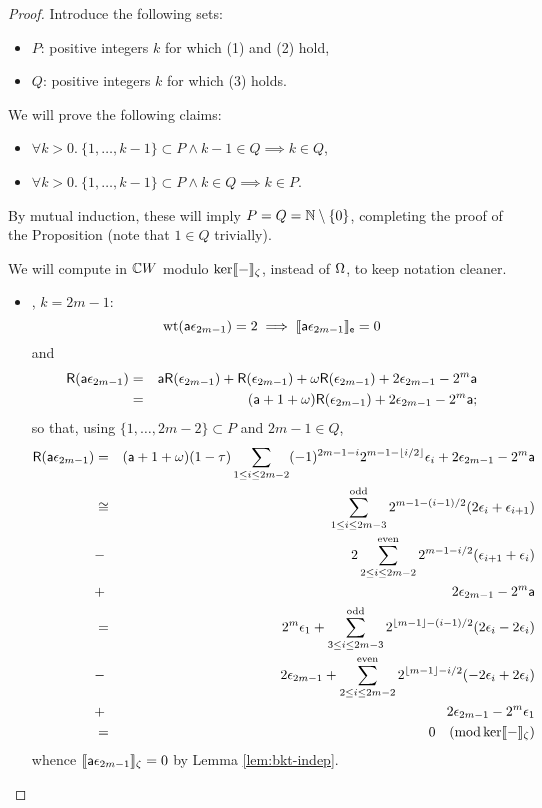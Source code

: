 \begin{proof}
Introduce the following sets: 
\begin{itemize}
        \item $P$: positive integers $k$ for which (1) and (2) hold,
        \item $Q$: positive integers $k$ for which (3) holds.
\end{itemize}
We will prove the following claims:
\begin{itemize}
        \item[\claimA] $\forall{k>0}.\ \{1,\dots,k-1\}\subset P \wedge k-1\in Q \implies k\in Q$,
        \item[\claimB] $\forall{k>0}.\ \{1,\dots,k-1\}\subset P \wedge k \in Q \implies k \in P$.
\end{itemize}
By mutual induction, these will imply $P=Q={\mathbb{N}}\setminus\{0\}$,
completing the proof of the Proposition (note that $1\in Q$ trivially).

We will compute in ${{\mathbb{C}}{}W}$ modulo $\ker\llbracket{-}\rrbracket_\zeta$, instead of $\Omega$, to keep notation cleaner.
\begin{itemize}
        \item\textbf{\claimB}, $k = 2m-1$:
\[
        \operatorname{\mathrm{wt}} (\mathsf{a} \epsilon_{2m-1}) = 2 \implies \llbracket{\mathsf{a}\epsilon_{2m-1}}\rrbracket_{\mathsf{e}} = 0
\] 
and
\begin{eqnarray*}
        \mathsf{R}(\mathsf{a} \epsilon_{2m-1}) &=& \mathsf{a} \mathsf{R}(\epsilon_{2m-1}) + \mathsf{R}(\epsilon_{2m-1}) + \omega \mathsf{R}(\epsilon_{2m-1}) + 2 \epsilon_{2m-1} - 2^m \mathsf{a}  \\
                               &=& (\mathsf{a} + 1 + \omega) \mathsf{R}(\epsilon_{2m-1}) + 2 \epsilon_{2m-1} - 2^m \mathsf{a};
\end{eqnarray*}     
so that, using $\{1,\dots,2m-2\} \subset P$ and $2m-1 \in Q$,
\begin{eqnarray*}
        \mathsf{R}(\mathsf{a} \epsilon_{2m-1}) &=& (\mathsf{a} + 1 + \omega) (1 - \tau) \sum_{1\le i\le 2m-2} (-1)^{2m-1-i} 2^{m-1 - \lfloor i/2\rfloor} \epsilon_i + 2 \epsilon_{2m-1} - 2^m \mathsf{a}\\ 
                               &\cong&   \sum_{1\le i\le 2m-3}^{\mathrm{odd}}  2^{m-1 - (i-1)/2} (2\epsilon_i + \epsilon_{i+1})  \\
                               &-& 2 \sum_{2\le i\le 2m-2}^{\mathrm{even}} 2^{m-1 - i/2} (\epsilon_{i+1} + \epsilon_i)\\
                               &+& 2 \epsilon_{2m-1} - 2^m \mathsf{a}  \\
                               &=& 2^m \epsilon_1 + \sum_{3\le i\le 2m-3}^{\mathrm{odd}} 2^{\lfloor m-1\rfloor - (i-1)/2} (2\epsilon_i - 2\epsilon_i)\\
                               &-& 2 \epsilon_{2m-1} + \sum_{2\le i\le 2m-2}^{\mathrm{even}} 2^{\lfloor m-1\rfloor - i/2} (-2\epsilon_i + 2\epsilon_i)\\
                               &+& 2 \epsilon_{2m-1} - 2^m \epsilon_1 \\
                               &=& 0\quad (\operatorname{\mathrm{mod}} \ker \llbracket{-}\rrbracket_\zeta)
  \end{eqnarray*}
whence $\llbracket{\mathsf{a}\epsilon_{2m-1}}\rrbracket_\zeta = 0$ by Lemma \ref{lem:bkt-indep}.


\end{itemize}
\end{proof}
